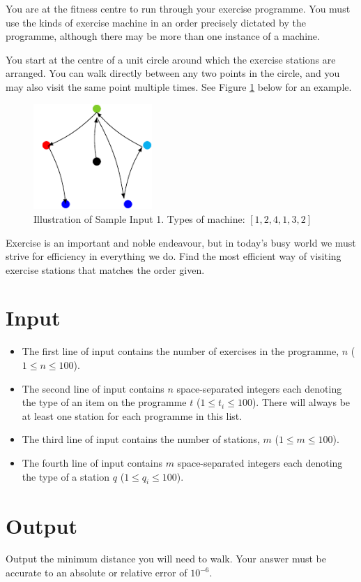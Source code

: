 
You are at the fitness centre to run through your exercise programme. You must
use the kinds of exercise machine in an order precisely dictated by the
programme, although there may be more than one instance of a machine.

You start at the centre of a unit circle around which the exercise stations are
arranged. You can walk directly between any two points in the circle, and you
may also visit the same point multiple times.
See Figure \ref{fig:jammedgym} below for an example.

\begin{figure}[h!]
  \centering
  \includegraphics[width=0.4\textwidth]{fig}
  \caption{Illustration of Sample Input 1. Types of machine: $[1, 2, 4, 1, 3, 2]$}
  \label{fig:jammedgym}
\end{figure}

Exercise is an important and noble endeavour, but in today's busy world we must
strive for efficiency in everything we do. Find the most efficient way of
visiting exercise stations that matches the order given.

\section*{Input}
\begin{itemize}
\item The first line of input contains the number of exercises in the programme,
      $n$ ($1 \le n \le 100$).
\item The second line of input contains $n$ space-separated integers
      each denoting the type of an item on the programme $t$ ($1 \le t_i \le 100$).
      There will always be at least one station for each programme in this list.
\item The third line of input contains the number of stations,
      $m$ ($1 \le m \le 100$).
\item The fourth line of input contains $m$ space-separated integers
      each denoting the type of a station $q$ ($1 \le q_i \le 100$).
\end{itemize}

\section*{Output}

Output the minimum distance you will need to walk.
Your answer must be accurate to an absolute or relative error of $10^{-6}$.
